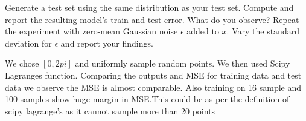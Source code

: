 \documentclass[a4paper]{article}
\theoremstyle{definition}
\newenvironment{soln}{
    \leavevmode\color{blue}\ignorespaces
}{}
\begin{document}
Generate a test set using the same distribution as your test set. Compute and report the resulting model’s train and test error. What do you observe?
Repeat the experiment with zero-mean Gaussian noise $\epsilon$ added to $x$. Vary the standard deviation for $\epsilon$ and report your findings.\\
\begin{soln}
    We chose $[0,2pi]$ and uniformly sample random points. We then used Scipy Lagranges function.
    Comparing the outputs and MSE for training data and test data we observe the MSE is almost comparable. Also training on 16 sample and 100 samples  show huge margin in MSE.This could be as per the definition of scipy lagrange's as it cannot sample more than 20 points \\
\begin{center}
    


\end{center}
\end{soln}
\end{document}
